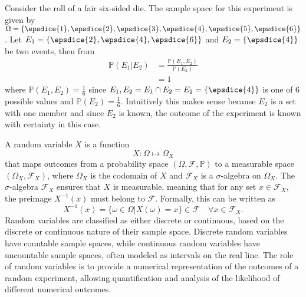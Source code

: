 \begin{example}
	Consider the roll of a fair six-sided die. The sample space for this experiment is given by $\Omega = \{ \epsdice{1}, \epsdice{2}, \epsdice{3}, \epsdice{4}, \epsdice{5}, \epsdice{6} \}$. Let $E_1 = \{\epsdice{2}, \epsdice{4}, \epsdice{6}\}$ and $E_2 = \{\epsdice{4}\}$ be two events, then from 
	\begin{equation}
		\begin{split}
			\mathbb{P}(E_1|E_2) &= \frac{\mathbb{P}(E_1, E_2)}{\mathbb{P}(E_2)}\\
			& = 1
		\end{split}
	\end{equation}
	where $\mathbb{P}(E_1,E_2)= \frac{1}{6}$ since $E_1,E_2 = E_1\cap E_2 = E_2=\{\epsdice{4}\}$ is one of $6$ possible values and $\mathbb{P}(E_2) = \frac{1}{6}$. Intuitively this makes sense because $E_2$ is a set with one member and since $E_2$ is known, the outcome of the experiment is known with certainty in this case.
\end{example}

\begin{definition}
	\label{def:random_Variable}
	A random variable $X$ is a function 
	\begin{equation}
		X: \Omega \mapsto \Omega_X
	\end{equation}
	that maps outcomes from a probability space $(\Omega, \mathcal{F}, \mathbb{P})$ to a measurable space $(\Omega_X, \mathcal{F}_X)$, where $\Omega_X$ is the codomain of $X$ and $\mathcal{F}_X$ is a $\sigma$-algebra on $\Omega_X$. The $\sigma$-algebra $\mathcal{F}_X$ ensures that $X$ is measurable, meaning that for any set $x \in \mathcal{F}_X$, the preimage $X^{-1}(x)$ must belong to $\mathcal{F}$. Formally, this can be written as
	\begin{equation}
		X^{-1}(x) = \{\omega \in \Omega | X(\omega) = x\} \in \mathcal{F} \quad \forall x \in \mathcal{F}_X.
	\end{equation}
	Random variables are classified as either discrete or continuous, based on the discrete or continuous nature of their sample space. Discrete random variables have countable sample spaces, while continuous random variables have uncountable sample spaces, often modeled as intervals on the real line. The role of random variables is to provide a numerical representation of the outcomes of a random experiment, allowing quantification and analysis of the likelihood of different numerical outcomes. 
\end{definition}

